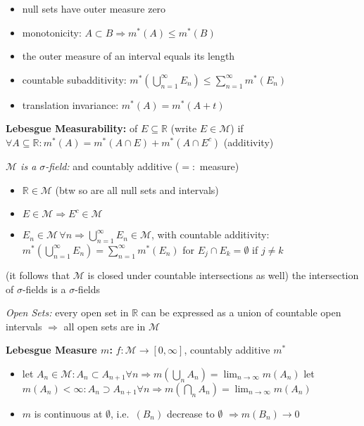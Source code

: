 \documentclass[8pt,twoside]{extarticle}
\begin{document}
\begin{multicols}{2}
\begin{itemize}[itemsep=0em, topsep=0pt, partopsep=0pt,parsep=0pt, leftmargin=1.0em]
\item null sets have outer measure zero
\item monotonicity: $A\subset B \Rightarrow m^*(A)\leq m^*(B)$
\item the outer measure of an interval equals its length
\item countable subadditivity: $m^*\left(\bigcup_{n=1}^\infty E_n\right)\leq \sum_{n=1}^\infty m^*(E_n)$
\item translation invariance: $m^*(A)=m^*(A+t)$
\end{itemize}

\textbf{Lebesgue Measurability:} of $E\subseteq\mathbb{R}$ (write $E\in\mathcal{M}$) if $\forall A\subseteq \mathbb{R}: m^*(A)=m^*(A\cap E)+m^*(A\cap E^c)$ (additivity)

\textit{$\mathcal{M}$ is a $\sigma$-field:} and countably additive ($=:$ measure)

\begin{itemize}[itemsep=0em, topsep=0pt, partopsep=0pt,parsep=0pt, leftmargin=1.0em]
\item $\mathbb{R}\in \mathcal{M}$ (btw so are all null sets and intervals)
\item $E\in\mathcal{M}\Rightarrow E^c\in \mathcal{M}$
\item $E_n{\in} \mathcal{M}\,\forall n \Rightarrow \bigcup_{n=1}^\infty E_n \in \mathcal{M}$, with countable additivity: $m^*(\bigcup_{n=1}^\infty E_n) = \sum_{n=1}^\infty m^*(E_n)$ for $E_j\cap E_k=\emptyset$ if $j\neq k$
\end{itemize}
(it follows that $\mathcal{M}$ is closed under countable intersections as well)
the intersection of $\sigma$-fields is a $\sigma$-fields

\textit{Open Sets:} every open set in $\mathbb{R}$ can be expressed as a union of countable open intervals $\Rightarrow$ all open sets are in $\mathcal{M}$

\textbf{Lebesgue Measure $m$:} $f:\mathcal{M}\to [0,\infty]$, countably additive $m^*$




\begin{itemize}[itemsep=0em, topsep=0pt, partopsep=0pt,parsep=0pt, leftmargin=1.0em]
\item let $A_n\in \mathcal{M}: A_n\subset A_{n+1} \forall n \Rightarrow m(\bigcup_n A_n)=\displaystyle\lim_{n\to \infty} m(A_n)$ \newline
\hspace{1em} let $m(A_n)<\infty: A_n\supset A_{n+1} \forall n \Rightarrow m(\bigcap_n A_n)=\displaystyle\lim_{n\to \infty} m(A_n)$
\item $m$ is continuous at $\emptyset$, i.e.\ $(B_n)$ decrease to $\emptyset$ $\Rightarrow m(B_n)\to 0$
\end{itemize}










\end{multicols}
\end{document}
